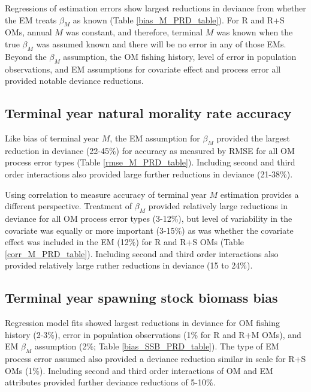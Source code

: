 \documentclass[
  12pt,
]{article}
\begin{document}
Regressions of estimation errors show largest reductions in deviance
from whether the EM treats \(\beta_M\) as known (Table
\ref{bias_M_PRD_table}). For R and R+S OMs, annual \(M\) was constant,
and therefore, terminal \(M\) was known when the true \(\beta_M\) was
assumed known and there will be no error in any of those EMs. Beyond the
\(\beta_M\) assumption, the OM fishing history, level of error in
population observations, and EM assumptions for covariate effect and
process error all provided notable deviance reductions.

\subsection*{Terminal year natural morality rate
accuracy}\label{terminal-year-natural-morality-rate-accuracy}

Like bias of terminal year \(M\), the EM assumption for \(\beta_M\)
provided the largest reduction in deviance (22-45\%) for accuracy as
measured by RMSE for all OM process error types (Table
\ref{rmse_M_PRD_table}). Including second and third order interactions
also provided large further reductions in deviance (21-38\%).

Using correlation to measure accuracy of terminal year \(M\) estimation
provides a different perspective. Treatment of \(\beta_M\) provided
relatively large reductions in deviance for all OM process error types
(3-12\%), but level of variability in the covariate was equally or more
important (3-15\%) as was whether the covariate effect was included in
the EM (12\%) for R and R+S OMs (Table \ref{corr_M_PRD_table}).
Including second and third order interactions also provided relatively
large ruther reductions in deviance (15 to 24\%).

\subsection*{Terminal year spawning stock biomass
bias}\label{terminal-year-spawning-stock-biomass-bias}

Regression model fits showed largest reductions in deviance for OM
fishing history (2-3\%), error in population observations (1\% for R and
R+M OMs), and EM \(\beta_M\) assumption (2\%; Table
\ref{bias_SSB_PRD_table}). The type of EM process error assumed also
provided a deviance reduction similar in scale for R+S OMs (1\%).
Including second and third order interactions of OM and EM attributes
provided further deviance reductions of 5-10\%.
\end{document}
